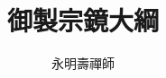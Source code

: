 \documentclass[11pt]{article}
\begin{document}
\title{御製宗鏡大綱}
\author{永明壽禪師}
\date{}
\maketitle
\newpage

\tableofcontents
\newpage







\printindex
\end{document}
